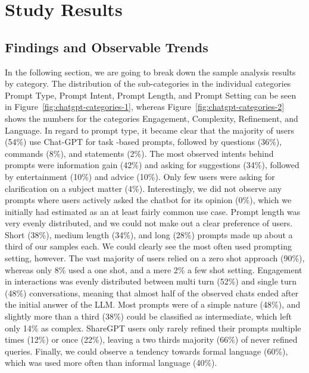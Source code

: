 \section{Study Results}
\label{sec:study-results}

\subsection{Findings and Observable Trends}
\label{subsec:findings-and-observable-trends}
In the following section, we are going to break down the sample analysis results by category.
The distribution of the sub-categories in the individual categories Prompt Type, Prompt
Intent, Prompt Length, and Prompt Setting can be seen in Figure~\ref{fig:chatgpt-categories-1},
whereas Figure~\ref{fig:chatgpt-categories-2} shows the numbers for the categories Engagement,
Complexity, Refinement, and Language.
In regard to prompt type, it became clear that the majority of users (54\%) use Chat-GPT for task -based prompts, followed by questions (36\%), commands (8\%), and statements (2\%).
The most observed intents behind prompts were information gain (42\%) and asking for suggestions (34\%), followed by entertainment (10\%) and advice (10\%).
Only few users were asking for clarification on a subject matter (4\%).
Interestingly, we did not observe any prompts where users actively asked the chatbot for its
opinion (0\%), which we initially had estimated as an at least fairly common use case.
Prompt length was very evenly distributed, and we could not make out a clear preference of users.
Short (38\%), medium length (34\%), and long (28\%) prompts made up about a third of our samples
each.
We could clearly see the most often used prompting setting, however.
The vast majority of users relied on a zero shot approach (90\%), whereas only 8\% used a one shot,
and a mere 2\% a few shot setting.
Engagement in interactions was evenly distributed between multi turn (52\%) and single turn (48\%)
conversations, meaning that almost half of the observed chats ended after the initial answer of
the LLM\@.
Most prompts were of a simple nature (48\%), and slightly more than a third (38\%) could be
classified as intermediate, which left only 14\% as complex.
ShareGPT users only rarely refined their prompts multiple times (12\%) or once (22\%),
leaving a two thirds majority (66\%) of never refined queries.
Finally, we could observe a tendency towards formal language (60\%), which was used more often
than informal language (40\%).

